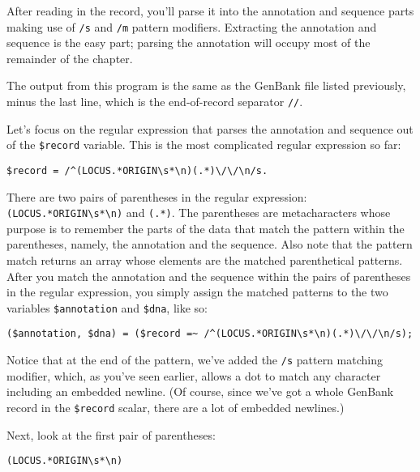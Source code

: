 After reading in the record, you'll parse it into the annotation and sequence parts making use of \verb|/s| and \verb|/m| pattern modifiers. Extracting the annotation and sequence is the easy part; parsing the annotation will occupy most of the remainder of the chapter.



The output from this program is the same as the GenBank file listed previously, minus the last line, which is the end-of-record separator \verb|//|.

Let's focus on the regular expression that parses the annotation and sequence out of the \verb|$record| variable. This is the most complicated regular expression so far:

\begin{lstlisting}
$record = /^(LOCUS.*ORIGIN\s*\n)(.*)\/\/\n/s.
\end{lstlisting}

There are two pairs of parentheses in the regular expression: \verb|(LOCUS.*ORIGIN\s*\n)| and \verb|(.*)|. The parentheses are metacharacters whose purpose is to remember the parts of the data that match the pattern within the parentheses, namely, the annotation and the sequence. Also note that the pattern match returns an array whose elements are the matched parenthetical patterns. After you match the annotation and the sequence within the pairs of parentheses in the regular expression, you simply assign the matched patterns to the two variables \verb|$annotation| and \verb|$dna|, like so:

\begin{lstlisting}
($annotation, $dna) = ($record =~ /^(LOCUS.*ORIGIN\s*\n)(.*)\/\/\n/s);
\end{lstlisting}

Notice that at the end of the pattern, we've added the \verb|/s| pattern matching modifier, which, as you've seen earlier, allows a dot to match any character including an embedded newline. (Of course, since we've got a whole GenBank record in the \verb|$record| scalar, there are a lot of embedded newlines.)

Next, look at the first pair of parentheses:

\begin{lstlisting}
(LOCUS.*ORIGIN\s*\n)
\end{lstlisting}

